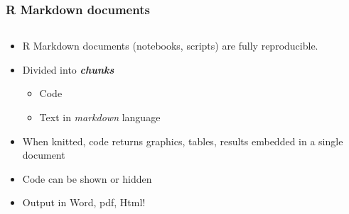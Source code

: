 \documentclass[xcolor=x11names,compress, aspectratio=169]{beamer}
\renewcommand{\(}{\begin{columns}}
\renewcommand{\)}{\end{columns}}
\newcommand{\<}[1]{\begin{column}{#1}}
\renewcommand{\>}{\end{column}}
\begin{document}
\begin{frame}
\frametitle{ R Markdown documents}
\begin{columns}[t]
 \begin{column}{0.5\textwidth}
\begin{itemize}[<+->]
    \item R Markdown documents (notebooks, scripts) are fully reproducible.
    \item Divided into \textit{\textbf{chunks}}
    \begin{itemize}
        \item Code 
        \item Text in \textit{markdown} language
    \end{itemize}
   \item When knitted, code returns graphics, tables, results embedded in a single document
   \item Code can be shown or hidden
   \item Output in Word, pdf, Html! 
\end{itemize}
\end{column}
  \begin{column}{0.5\textwidth}
    \begin{center}

\end{center}
\end{column}
\end{columns}
\end{frame}
\end{document}

